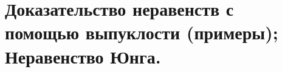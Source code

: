 \documentclass[../main.tex]{subfiles}
\begin{document}
\newpage
\section{Доказательство неравенств с помощью выпуклости (примеры); Неравенство Юнга.}
\end{document}

